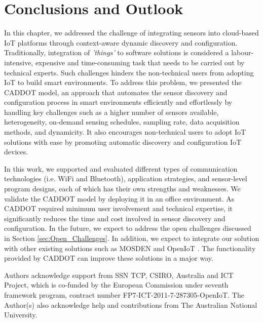 \documentclass[graybox]{svmult}
\newcommand{\things}{\textit{'things' }}
\begin{document}
\section{Conclusions and Outlook}
\label{sec:Conclusions}



In this chapter, we addressed the challenge of integrating sensors into cloud-based IoT platforms through context-aware dynamic discovery and configuration. Traditionally, integration of \things to software solutions is considered a labour-intensive, expensive and time-consuming task that needs to be carried out by  technical experts. Such challenges hinders the non-technical users from adopting IoT to build smart environments. To address this problem, we presented the CADDOT model, an approach that automates the sensor discovery and configuration process in smart environments efficiently and effortlessly by handling key challenges such as a higher number of sensors available, heterogeneity, on-demand sensing schedules, sampling rate, data acquisition methods, and dynamicity. It also encourages non-technical users to adopt IoT solutions with ease by promoting automatic discovery and configuration IoT devices.



 In this work, we supported and evaluated different types of communication technologies (i.e. WiFi and Bluetooth), application strategies, and sensor-level program designs, each of which has their own strengths and weaknesses. We validate the CADDOT model by deploying it in an office environment. As CADDOT required minimum user involvement and technical expertise, it significantly reduces the time and cost involved in sensor discovery and configuration. In the future, we expect to address the open challenges discussed in Section \ref{sec:Open_Challenges}. In addition, we expect to integrate our solution with other existing solutions such as MOSDEN \cite{ZMP009} and OpenIoT \cite{P377}. The functionality provided by CADDOT can improve these solutions in a major way.









\begin{acknowledgement}
Authors acknowledge support from SSN TCP, CSIRO, Australia and ICT  Project, which is co-funded by the European Commission under seventh framework program, contract number FP7-ICT-2011-7-287305-OpenIoT. The Author(s) also acknowledge help and contributions from The Australian National University.
\end{acknowledgement}



















 





 
\end{document}
